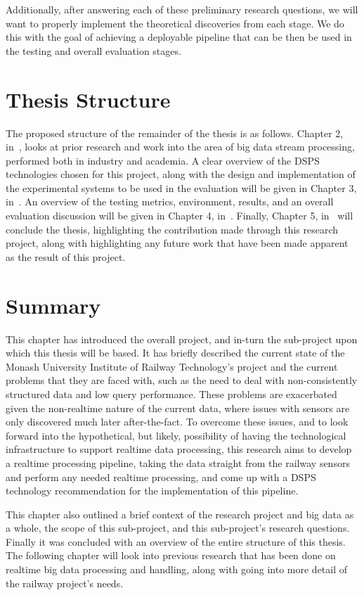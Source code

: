 Additionally, after answering each of these preliminary research questions, we will want to properly implement the
theoretical discoveries from each stage. We do this with the goal of achieving a deployable pipeline that can be then
be used in the testing and overall evaluation stages.



\section{Thesis Structure} %
\label{sub:proposed_thesis_chapter_headings}

The proposed structure of the remainder of the thesis is as follows. Chapter 2, in~, looks at prior
research and work into the area of big data stream processing, performed both in industry and academia.
A clear overview of the DSPS technologies chosen for this project, along with the design and implementation
of the experimental systems to be used in the evaluation will be given in Chapter 3, in~.
An overview of the testing metrics, environment, results, and an overall evaluation discussion will be given in Chapter 4, in~.
Finally, Chapter 5, in~ will conclude the thesis, highlighting the contribution made through this research project,
along with highlighting any future work that have been made apparent as the result of this project.



\section{Summary} %
\label{sec:summary}

This chapter has introduced the overall project, and in-turn the sub-project upon which this thesis will be based. It
has briefly described the current state of the Monash University Institute of Railway Technology's project and the current
problems that they are faced with, such as the need to deal with non-consistently structured data and low query
performance. These problems are exacerbated given the non-realtime nature of the current data, where issues with sensors
are only discovered much later after-the-fact. To overcome these issues, and to look forward into the hypothetical,
but likely, possibility of having the technological infrastructure to support realtime data processing, this research
aims to develop a realtime processing pipeline, taking the data straight from the railway sensors and perform any
needed realtime processing, and come up with a DSPS technology recommendation for the implementation of this pipeline.

This chapter also outlined a brief context of the research project and big data as a whole, the scope of this sub-project,
and this sub-project's research questions. Finally it was concluded with an overview of the entire structure of this thesis. The
following chapter will look into previous research that has been done on realtime big data processing and handling,
along with going into more detail of the railway project's needs.

